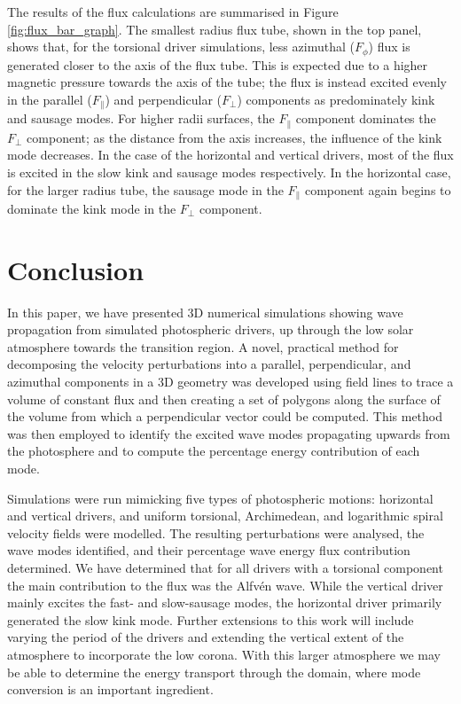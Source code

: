 The results of the flux calculations are summarised in Figure \ref{fig:flux_bar_graph}.
 The smallest radius flux tube, shown in the top panel, shows that, for the torsional driver simulations, less azimuthal ($F_\phi$) flux is generated closer to the axis of the flux tube. 
 This is expected due to a higher magnetic pressure towards the axis of the tube; the flux is instead excited evenly in the parallel ($F_\parallel$) and perpendicular ($F_\perp$) components as predominately kink and sausage modes. 
 For higher radii surfaces, the $F_\parallel$ component dominates the $F_\perp$ component; as the distance from the axis increases, the influence of the kink mode decreases.
 In the case of the horizontal and vertical drivers, most of the flux is excited in the slow kink and sausage modes respectively.
 In the horizontal case, for the larger radius tube, the sausage mode in the $F_\parallel$ component again begins to dominate the kink mode in the $F_\perp$ component.

\section{Conclusion}\label{sec:conclusion}
In this paper, we have presented 3D numerical simulations showing wave propagation from simulated photospheric drivers, up through the low solar atmosphere towards the transition region.
 A novel, practical method for decomposing the velocity perturbations into a parallel, perpendicular, and azimuthal components in a 3D geometry was developed using field lines to trace a volume of constant flux and then creating a set of polygons along the surface of the volume from which a perpendicular vector could be computed. 
 This method was then employed to identify the excited wave modes propagating upwards from the photosphere and to compute the percentage energy contribution of each mode.

Simulations were run mimicking five types of photospheric motions: horizontal and vertical drivers, and uniform torsional, Archimedean, and logarithmic spiral velocity fields were modelled.
 The resulting perturbations were analysed, the wave modes identified, and their percentage wave energy flux contribution determined. 
 We have determined that for all drivers with a torsional component the main contribution to the flux was the Alfv\'en wave.
 While the vertical driver mainly excites the fast- and slow-sausage modes, the horizontal driver primarily generated the slow kink mode.
 Further extensions to this work will include varying the period of the drivers and extending the vertical extent of the atmosphere to incorporate the low corona.
 With this larger atmosphere we may be able to determine the energy transport through the domain, where mode conversion is an important ingredient.
 
